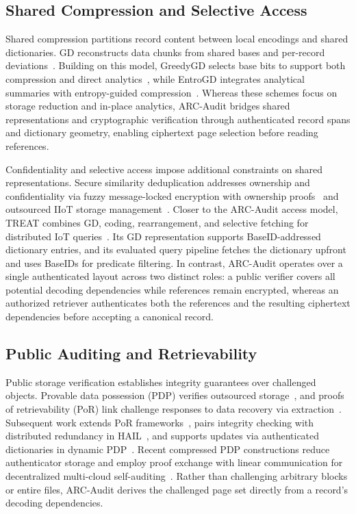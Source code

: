 \documentclass[10pt,journal]{IEEEtran}
\begin{document}
\subsection{Shared Compression and Selective Access}
Shared compression partitions record content between local encodings and shared dictionaries. GD reconstructs data chunks from shared bases and per-record deviations~\cite{Talasila2019}. Building on this model, GreedyGD selects base bits to support both compression and direct analytics~\cite{Hurst2024GreedyGD}, while EntroGD integrates analytical summaries with entropy-guided compression~\cite{Zhao2026EntroGD}. Whereas these schemes focus on storage reduction and in-place analytics, ARC-Audit bridges shared representations and cryptographic verification through authenticated record spans and dictionary geometry, enabling ciphertext page selection before reading references.

Confidentiality and selective access impose additional constraints on shared representations. Secure similarity deduplication addresses ownership and confidentiality via fuzzy message-locked encryption with ownership proofs~\cite{Jiang2023FuzzyDedup} and outsourced IIoT storage management~\cite{Gao2024}. Closer to the ARC-Audit access model, TREAT combines GD, coding, rearrangement, and selective fetching for distributed IoT queries~\cite{Taurone2024TREAT}. Its GD representation supports BaseID-addressed dictionary entries, and its evaluated query pipeline fetches the dictionary upfront and uses BaseIDs for predicate filtering. In contrast, ARC-Audit operates over a single authenticated layout across two distinct roles: a public verifier covers all potential decoding dependencies while references remain encrypted, whereas an authorized retriever authenticates both the references and the resulting ciphertext dependencies before accepting a canonical record.

\subsection{Public Auditing and Retrievability}
Public storage verification establishes integrity guarantees over challenged objects. Provable data possession (PDP) verifies outsourced storage~\cite{Ateniese2007PDP}, and proofs of retrievability (PoR) link challenge responses to data recovery via extraction~\cite{Juels2007POR,ShachamWaters2013}. Subsequent work extends PoR frameworks~\cite{Bowers2009PORTheory}, pairs integrity checking with distributed redundancy in HAIL~\cite{Bowers2009HAIL}, and supports updates via authenticated dictionaries in dynamic PDP~\cite{Erway2009DPDP}. Recent compressed PDP constructions reduce authenticator storage and employ proof exchange with linear communication for decentralized multi-cloud self-auditing~\cite{Yang2025CompressedPDP}. Rather than challenging arbitrary blocks or entire files, ARC-Audit derives the challenged page set directly from a record's decoding dependencies.
\end{document}
